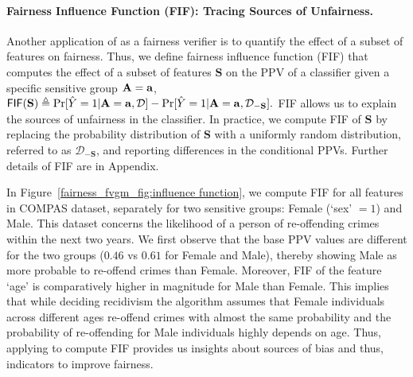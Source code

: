 \paragraph{Fairness Influence Function (FIF): Tracing Sources of Unfairness.}
Another application of \fvgm{} as a fairness verifier is to quantify the effect of a subset of features on fairness. Thus, we define fairness influence function (FIF)  that computes the effect of a subset of features $\mathbf{S}$ on the PPV of a classifier given a specific sensitive group $ \mathbf{A} = \mathbf{a}$,
$
	\mathsf{FIF}(\mathbf{S}) \triangleq \Pr[\hat{Y} = 1 | \mathbf{A} = \mathbf{a}, \mathcal{D}] - \Pr[\hat{Y} = 1 | \mathbf{A} = \mathbf{a},  \mathcal{D}_{-\mathbf{S}}].
$
FIF allows us to explain the sources of unfairness in the classifier. In practice, we compute FIF of $\mathbf{S}$ by replacing the probability distribution of $\mathbf{S}$ with a uniformly random distribution, referred to as  $ \mathcal{D}_{-\mathbf{S}} $, and reporting differences in the conditional PPVs. Further details of FIF are in Appendix.

In Figure~\ref{fairness_fvgm_fig:influence function}, we compute FIF for all features in COMPAS dataset, separately for two sensitive groups: Female (`sex' $ = 1 $) and Male. This dataset concerns the likelihood of a person of re-offending crimes within the next two years. We first observe that the base PPV values are different for the two groups ($ 0.46 $ vs $ 0.61 $ for Female and Male), thereby showing Male as more probable to re-offend crimes than Female. Moreover, FIF of the feature `age' is comparatively higher in magnitude for Male than Female. 
This implies that while deciding recidivism the algorithm assumes that Female individuals across different ages re-offend crimes with almost the same probability and the probability of re-offending for Male individuals highly depends on age. Thus, applying {\fvgm} to compute FIF provides us insights about sources of bias and thus, indicators to improve fairness.


